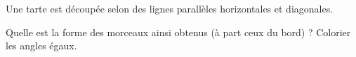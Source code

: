 
\begin{exercice}\label{exo2smath-0062}

    Une tarte est découpée selon des lignes parallèles horizontales et diagonales.

\begin{center}
   
\end{center}

Quelle est la forme des morceaux ainsi obtenus (à part ceux du bord) ? Colorier les angles égaux.


\end{exercice}

